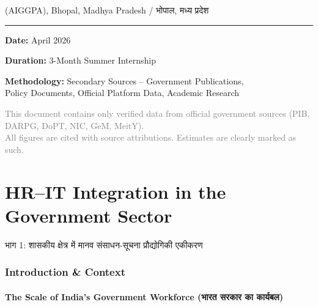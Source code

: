 \documentclass[12pt,a4paper]{article}
\newcommand{\hindi}[1]{{\hindifont #1}}
\begin{document}
\begin{titlepage}
\begin{center}
{\large\textcolor{govgold}{(AIGGPA), Bhopal, Madhya Pradesh / \hindi{भोपाल, मध्य प्रदेश}}}

\vspace{1cm}

\rule{0.6\textwidth}{1pt}

\vspace{0.8cm}

{\large\textbf{Date:} April 2026}

\vspace{0.3cm}

{\large\textbf{Duration:} 3-Month Summer Internship}

\vspace{0.3cm}

{\large\textbf{Methodology:} Secondary Sources  --  Government Publications,\\Policy Documents, Official Platform Data, Academic Research}

\vfill

{\small\textcolor{gray}{This document contains only verified data from official government sources (PIB, DARPG, DoPT, NIC, GeM, MeitY).\\All figures are cited with source attributions. Estimates are clearly marked as such.}}

\end{center}
\end{titlepage}

\tableofcontents
\newpage

\part{HR--IT Integration in the Government Sector}
\begin{center}{\Large\hindi{भाग 1: शासकीय क्षेत्र में मानव संसाधन-सूचना प्रौद्योगिकी एकीकरण}}\end{center}

\section{Introduction \& Context}

\subsection{The Scale of India's Government Workforce (\hindi{भारत सरकार का कार्यबल})}
\end{document}
